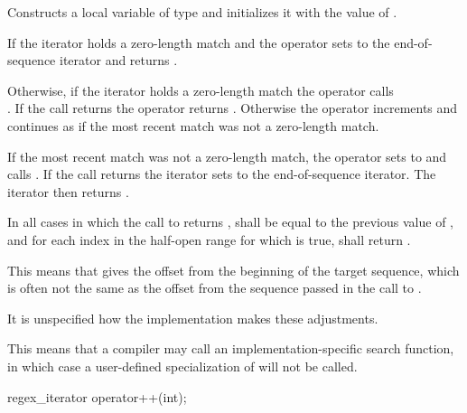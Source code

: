 \begin{itemdescr}
\pnum
\effects  Constructs a local variable  of type  and
initializes it with the value of .

\pnum
If the iterator holds a zero-length match and  the operator
sets  to the end-of-sequence iterator and returns .

\pnum
{}%
%
Otherwise, if the iterator holds a zero-length match the operator calls
\\. If the call returns  the operator
returns . Otherwise the operator increments  and continues as if
the most recent match was not a zero-length match.

\pnum
{}%
If the most recent match was not a zero-length match, the operator sets
 to  and 
calls . If the call returns
 the iterator sets  to the end-of-sequence iterator. The
iterator then returns .

\pnum
In all cases in which the call to  returns ,
 shall be equal to the previous value of
, and for each index  in the half-open range
\tcode{[0, match.size())} for which  is true,
shall return .

\pnum
\enternote This means that  gives the
offset from the beginning of the target sequence, which is often not
the same as the offset from the sequence passed in the call
to . \exitnote

\pnum
It is unspecified how the implementation makes these adjustments.

\pnum
\enternote This means that a compiler may call an
implementation-specific search function, in which case a user-defined
specialization of  will not be
called. \exitnote
\end{itemdescr}

%
%
\begin{itemdecl}
regex_iterator operator++(int); 
\end{itemdecl}

